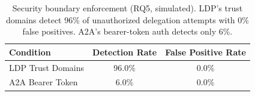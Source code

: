 \begin{table}[t]
\centering
\caption{Security boundary enforcement (RQ5, simulated). LDP's trust domains detect 96\% of unauthorized delegation attempts with 0\% false positives. A2A's bearer-token auth detects only 6\%.}
\label{tab:security}
\begin{tabular}{lcc}
\toprule
Condition & Detection Rate & False Positive Rate \\
\midrule
LDP Trust Domains & 96.0\% & 0.0\% \\
A2A Bearer Token & 6.0\% & 0.0\% \\
\bottomrule
\end{tabular}
\end{table}